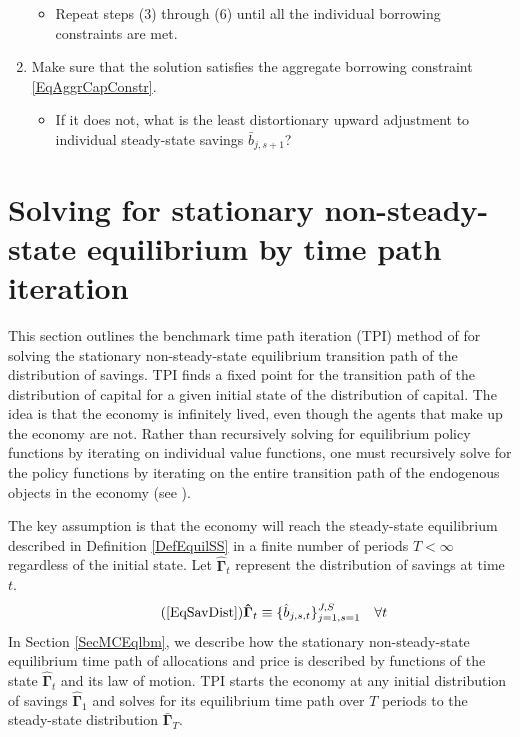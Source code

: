 \documentclass[letterpaper,12pt]{article}
\theoremstyle{definition}
\begin{document}
\begin{enumerate}
\begin{itemize}
        \item Repeat steps (3) through (6) until all the individual borrowing constraints are met.
      \end{itemize}
    \item Make sure that the solution satisfies the aggregate borrowing constraint \eqref{EqAggrCapConstr}.
      \begin{itemize}
        \item If it does not, what is the least distortionary upward adjustment to individual steady-state savings $\bar{b}_{j,s+1}$?
      \end{itemize}
  \end{enumerate}


\newpage
\section{Solving for stationary non-steady-state equilibrium by time path iteration}\label{AppNonSSsolve}

  \setcounter{equation}{0}

  This section outlines the benchmark time path iteration (TPI) method of \citet{AuerbachKotlikoff:1987} for solving the stationary non-steady-state equilibrium transition path of the distribution of savings. TPI finds a fixed point for the transition path of the distribution of capital for a given initial state of the distribution of capital. The idea is that the economy is infinitely lived, even though the agents that make up the economy are not. Rather than recursively solving for equilibrium policy functions by iterating on individual value functions, one must recursively solve for the policy functions by iterating on the entire transition path of the endogenous objects in the economy (see \citet[ch. 17]{StokeyLucas:1989}).

  The key assumption is that the economy will reach the steady-state equilibrium described in Definition \ref{DefEquilSS} in a finite number of periods $T<\infty$ regardless of the initial state. Let $\bm{\hat{\Gamma}}_t$ represent the distribution of savings at time $t$.
  \begin{equation}\tag{\ref{EqSavDist}}
    \bm{\hat{\Gamma}}_t \equiv \{\hat{b}_{j,s,t}\}_{j=1,s=1}^{J,S} \quad\forall t
  \end{equation}
  In Section \ref{SecMCEqlbm}, we describe how the stationary non-steady-state equilibrium time path of allocations and price is described by functions of the state $\bm{\hat{\Gamma}}_t$ and its law of motion. TPI starts the economy at any initial distribution of savings $\bm{\hat{\Gamma}}_1$ and solves for its equilibrium time path over $T$ periods to the steady-state distribution $\bm{\bar{\Gamma}}_T$.
\end{document}
